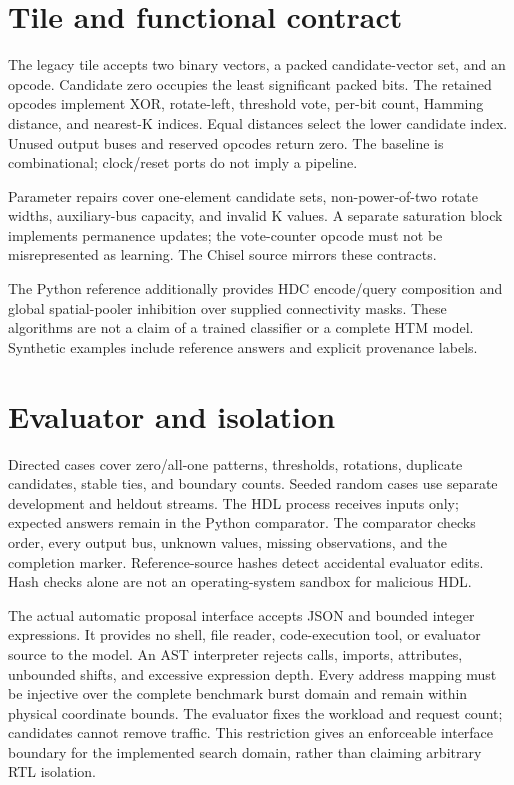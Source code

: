 \documentclass[conference]{IEEEtran}
\begin{document}
\section{Tile and functional contract}
The legacy tile accepts two binary vectors, a packed candidate-vector set,
and an opcode. Candidate zero occupies the least significant packed bits.
The retained opcodes implement XOR, rotate-left, threshold vote, per-bit count,
Hamming distance, and nearest-K indices. Equal distances select the lower
candidate index. Unused output buses and reserved opcodes return zero. The
baseline is combinational; clock/reset ports do not imply a pipeline.

Parameter repairs cover one-element candidate sets, non-power-of-two rotate
widths, auxiliary-bus capacity, and invalid K values. A separate saturation
block implements permanence updates; the vote-counter opcode must not be
misrepresented as learning. The Chisel source mirrors these contracts.

The Python reference additionally provides HDC encode/query composition and
global spatial-pooler inhibition over supplied connectivity masks. These
algorithms are not a claim of a trained classifier or a complete HTM model.
Synthetic examples include reference answers and explicit provenance labels.

\section{Evaluator and isolation}
Directed cases cover zero/all-one patterns, thresholds, rotations, duplicate
candidates, stable ties, and boundary counts. Seeded random cases use separate
development and heldout streams. The HDL process receives inputs only; expected
answers remain in the Python comparator. The comparator checks order, every
output bus, unknown values, missing observations, and the completion marker.
Reference-source hashes detect accidental evaluator edits. Hash checks alone
are not an operating-system sandbox for malicious HDL.

The actual automatic proposal interface accepts JSON and bounded integer
expressions. It provides no shell, file reader, code-execution tool, or evaluator
source to the model. An AST interpreter rejects calls, imports, attributes,
unbounded shifts, and excessive expression depth. Every address mapping must be
injective over the complete benchmark burst domain and remain within physical
coordinate bounds. The evaluator fixes the workload and request count; candidates
cannot remove traffic. This restriction gives an enforceable interface boundary
for the implemented search domain, rather than claiming arbitrary RTL isolation.
\end{document}
